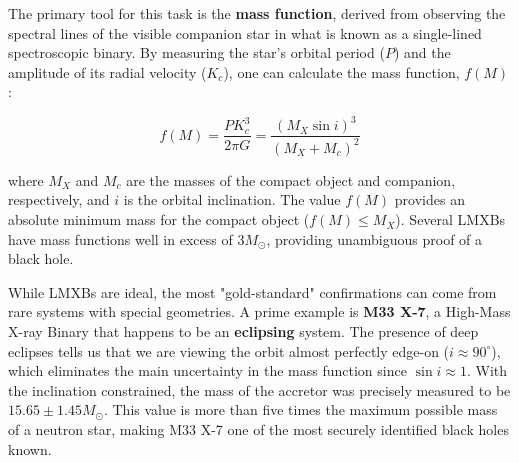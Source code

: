 The primary tool for this task is the \textbf{mass function}, derived from observing the spectral lines of the visible companion star in what is known as a single-lined spectroscopic binary. By measuring the star's orbital period ($P$) and the amplitude of its radial velocity ($K_c$), one can calculate the mass function, $f(M)$:

\[
f(M) = \frac{P K_c^3}{2\pi G} = \frac{(M_X \sin i)^3}{(M_X + M_c)^2}
\]

where $M_X$ and $M_c$ are the masses of the compact object and companion, respectively, and $i$ is the orbital inclination. The value $f(M)$ provides an absolute minimum mass for the compact object ($f(M) \leq M_X$). Several LMXBs have mass functions well in excess of $3 M_{\odot}$, providing unambiguous proof of a black hole.

While LMXBs are ideal, the most "gold-standard" confirmations can come from rare systems with special geometries. A prime example is \textbf{M33 X-7}, a High-Mass X-ray Binary that happens to be an \textbf{eclipsing} system. The presence of deep eclipses tells us that we are viewing the orbit almost perfectly edge-on ($i \approx 90^{\circ}$), which eliminates the main uncertainty in the mass function since $\sin i \approx 1$. With the inclination constrained, the mass of the accretor was precisely measured to be $15.65 \pm 1.45 M_{\odot}$. This value is more than five times the maximum possible mass of a neutron star, making M33 X-7 one of the most securely identified black holes known.